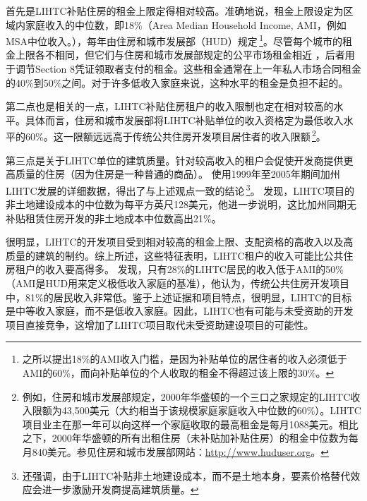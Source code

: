 \documentclass[lang=cn,11pt,a4paper]{paper}
\begin{document}
首先是LIHTC补贴住房的租金上限定得相对较高。准确地说，租金上限设定为区域内家庭收入的中位数，即18\%（Area Median Household Income, AMI，例如MSA中位收入。），每年由住房和城市发展部（HUD）规定\,\footnote{之所以提出18\%的AMI收入门槛，是因为补贴单位的居住者的收入必须低于AMI的60\%，而向补贴单位的个人收取的租金不得超过该上限的30\%。}。尽管每个城市的租金上限各不相同，但它们与住房和城市发展部规定的公平市场租金相近 \citep{Cummings1999257}，后者用于调节Section 8凭证领取者支付的租金。这些租金通常在上一年私人市场合同租金的40\%到50\%之间。对于许多低收入家庭来说，这种水平的租金是负担不起的。

第二点也是相关的一点，LIHTC补贴住房租户的收入限制也定在相对较高的水平。具体而言，住房和城市发展部将LIHTC补贴单位的收入资格定为最低收入水平的60\%。这一限额远远高于传统公共住房开发项目居住者的收入限额\,\footnote{例如，住房和城市发展部规定，2000年华盛顿的一个三口之家规定的LIHTC收入限额为43,500美元（大约相当于该规模家庭家庭收入中位数的60\%）。LIHTC项目业主在那一年可以向这样一个家庭收取的最高租金是每月1088美元。相比之下，2000年华盛顿的所有出租住房（未补贴加补贴住房）的租金中位数为每月840美元。参见住房和城市发展部网站：\url{http://www.huduser.org}。}。

第三点是关于LIHTC单位的建筑质量。针对较高收入的租户会促使开发商提供更高质量的住房（因为住房是一种普通的商品）。\cite{Eriksen2009141} 使用1999年至2005年期间加州LIHTC发展的详细数据，得出了与上述观点一致的结论\,\footnote{\cite{Eriksen2009141} 还强调，由于LIHTC补贴非土地建设成本，而不是土地本身，要素价格替代效应会进一步激励开发商提高建筑质量。}。\cite{Eriksen2009141} 发现，LIHTC项目的非土地建设成本的中位数为每平方英尺128美元，他进一步说明，这比加州同期无补贴租赁住房开发的非土地成本中位数高出21\%。

很明显，LIHTC的开发项目受到相对较高的租金上限、支配资格的高收入以及高质量的建筑的制约。综上所述，这些特征表明，LIHTC租户的收入可能比公共住房租户的收入要高得多。\cite{Wallace1995785} 发现，只有28\%的LIHTC居民的收入低于AMI的50\%（AMI是HUD用来定义极低收入家庭的基准），他认为，传统公共住房开发项目中，81\%的居民收入非常低。鉴于上述证据和项目特点，很明显，LIHTC的目标是中等收入家庭，而不是低收入家庭。因此，LIHTC也有可能与未受资助的开发项目直接竞争，这增加了LIHTC项目取代未受资助建设项目的可能性。
\end{document}
